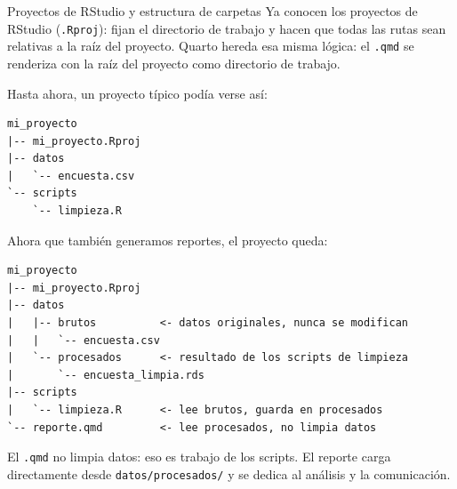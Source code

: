 \documentclass[8pt]{beamer}
\begin{document}
	\begin{frame}[fragile]{Proyectos de RStudio y estructura de carpetas}
		Ya conocen los proyectos de RStudio (\texttt{.Rproj}): fijan el directorio de trabajo y hacen que todas las rutas sean relativas a la raíz del proyecto. Quarto hereda esa misma lógica: el \texttt{.qmd} se renderiza con la raíz del proyecto como directorio de trabajo.

		Hasta ahora, un proyecto típico podía verse así:

\begin{lstlisting}
mi_proyecto
|-- mi_proyecto.Rproj
|-- datos
|   `-- encuesta.csv
`-- scripts
    `-- limpieza.R
\end{lstlisting}

		Ahora que también generamos reportes, el proyecto queda:

\begin{lstlisting}
mi_proyecto
|-- mi_proyecto.Rproj
|-- datos
|   |-- brutos          <- datos originales, nunca se modifican
|   |   `-- encuesta.csv
|   `-- procesados      <- resultado de los scripts de limpieza
|       `-- encuesta_limpia.rds
|-- scripts
|   `-- limpieza.R      <- lee brutos, guarda en procesados
`-- reporte.qmd         <- lee procesados, no limpia datos
\end{lstlisting}

		\begin{exampleblock}{}
			El \texttt{.qmd} no limpia datos: eso es trabajo de los scripts. El reporte carga directamente desde \texttt{datos/procesados/} y se dedica al análisis y la comunicación.
		\end{exampleblock}
	\end{frame}
\end{document}
